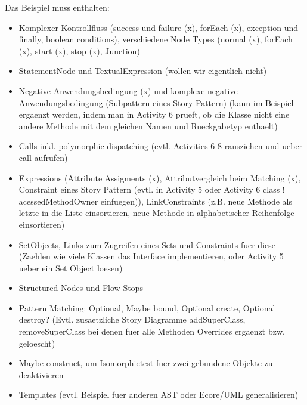 Das Beispiel muss enthalten:
\begin{itemize}
  \item Komplexer Kontrollfluss (success und failure (x), forEach (x), exception und finally, boolean conditions), verschiedene Node Types (normal (x), forEach (x), start (x), stop (x), Junction)
  \item StatementNode und TextualExpression (wollen wir eigentlich nicht)
  \item Negative Anwendungsbedingung (x) und komplexe negative Anwendungsbedingung (Subpattern eines Story Pattern) (kann im Beispiel ergaenzt werden, indem man in Activity 6 prueft, ob die Klasse nicht eine andere Methode mit dem gleichen Namen und Rueckgabetyp enthaelt) 
  \item Calls inkl. polymorphic dispatching  (evtl. Activities 6-8 rausziehen und ueber call aufrufen)
  \item Expressions (Attribute Assigments (x), Attributvergleich beim Matching (x), Constraint eines Story Pattern (evtl. in Activity 5 oder Activity 6 class != acessedMethodOwner einfuegen)), LinkConstraints (z.B. neue Methode als letzte in die Liste einsortieren, neue Methode in alphabetischer Reihenfolge einsortieren)
  \item SetObjects, Links zum Zugreifen eines Sets und Constraints fuer diese (Zaehlen wie viele Klassen das Interface implementieren, oder Activity 5 ueber ein Set Object loesen)
  \item Structured Nodes und Flow Stops
  \item Pattern Matching: Optional, Maybe bound, Optional create, Optional destroy? (Evtl. zusaetzliche Story Diagramme addSuperClass, removeSuperClass bei denen fuer alle Methoden Overrides ergaenzt bzw. geloescht)
  \item Maybe construct, um Isomorphietest fuer zwei gebundene Objekte zu deaktivieren
  \item Templates (evtl. Beispiel fuer anderen AST oder Ecore/UML generalisieren)
\end{itemize}